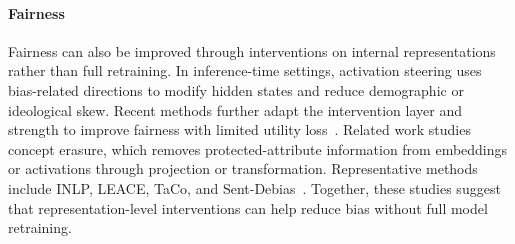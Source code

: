 \paragraph{Fairness}
Fairness can also be improved through interventions on internal representations rather than full retraining. In inference-time settings, activation steering uses bias-related directions to modify hidden states and reduce demographic or ideological skew. Recent methods further adapt the intervention layer and strength to improve fairness with limited utility loss~\citep{Li2025FairSteer}. Related work studies concept erasure, which removes protected-attribute information from embeddings or activations through projection or transformation. Representative methods include INLP, LEACE, TaCo, and Sent-Debias~\citep{Ravfogel2020INLP, Belrose2023LEACE, Jourdan2024TaCo, Liang2020SentDebias}. Together, these studies suggest that representation-level interventions can help reduce bias without full model retraining.





